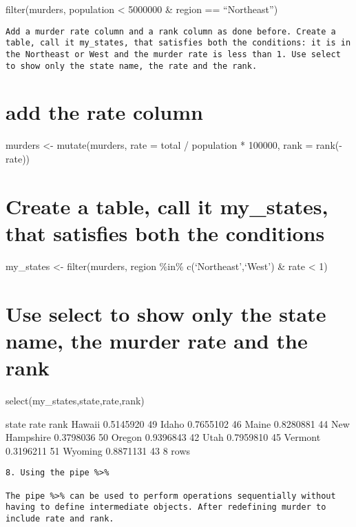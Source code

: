 \documentclass[
]{article}
\begin{document}
filter(murders, population \textless{} 5000000 \& region ==
``Northeast'')

\begin{verbatim}
Add a murder rate column and a rank column as done before. Create a table, call it my_states, that satisfies both the conditions: it is in the Northeast or West and the murder rate is less than 1. Use select to show only the state name, the rate and the rank.
\end{verbatim}

\hypertarget{add-the-rate-column}{%
\section{add the rate column}\label{add-the-rate-column}}

murders \textless- mutate(murders, rate = total / population * 100000,
rank = rank(-rate))

\hypertarget{create-a-table-call-it-my_states-that-satisfies-both-the-conditions}{%
\section{Create a table, call it my\_states, that satisfies both the
conditions}\label{create-a-table-call-it-my_states-that-satisfies-both-the-conditions}}

my\_states \textless- filter(murders, region \%in\%
c(`Northeast',`West') \& rate \textless{} 1)

\hypertarget{use-select-to-show-only-the-state-name-the-murder-rate-and-the-rank}{%
\section{Use select to show only the state name, the murder rate and the
rank}\label{use-select-to-show-only-the-state-name-the-murder-rate-and-the-rank}}

select(my\_states,state,rate,rank)

state rate rank Hawaii 0.5145920 49 Idaho 0.7655102 46 Maine 0.8280881
44 New Hampshire 0.3798036 50 Oregon 0.9396843 42 Utah 0.7959810 45
Vermont 0.3196211 51 Wyoming 0.8871131 43 8 rows

\begin{verbatim}
8. Using the pipe %>%

The pipe %>% can be used to perform operations sequentially without having to define intermediate objects. After redefining murder to include rate and rank.
\end{verbatim}
\end{document}

